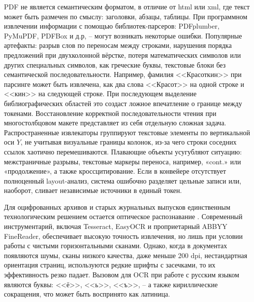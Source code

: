 PDF не является семантическим форматом, в отличие от html или xml, где текст может быть размечен по смыслу: заголовки, абзацы, таблицы. При программном извлечении информации с помощью библиотек-парсеров: PDFplumber, PyMuPDF, PDFBox и д.р\cite{hong2021challenges}, -- могут возникать некоторые ошибки. Популярные артефакты: разрыв слов по переносам между строками, нарушения порядка предложений при двухколонной вёрстке, потеря математических символов или других специальных символов, как греческие буквы, текстовые блоки без семантической последовательности. Например, фамилия <<Красоткин>> при парсинге может быть извлечена, как два слова <<Красот>> на одной строке и <<кин>> на следующей строке. При последующем выделение библиографических областей это создаст ложное впечатление о границе между токенами. Восстановление корректной последовательности чтения при многостолбцовом макете представляет из себя отдельную сложная задача. Распространенные извлекаторы группируют текстовые элементы по вертикальной оси \(Y\), не учитывая визуальные границы колонок, из-за чего строки соседних ссылок хаотично перемешиваются. Плавающие объекты усугубляют ситуацию: межстраничные разрывы, текстовые маркеры переноса, например, «cont.» или «продолжение», а также кроссцитирование. Если в конвейере отсутствует полноценный layout-анализ, система ошибочно разделяет цельные записи или, наоборот, сливает независимые источники в единый токен.

Для оцифрованных архивов и старых журнальных выпусков единственным технологическим решением остается оптическое распознавание \cite{sumathi2012techniques}. Современный инструментарий, включая Tesseract, EasyOCR и проприетарный ABBYY FineReader, обеспечивает высокую точность извлечения, но лишь при условии работы с чистыми горизонтальными сканами. Однако, когда в документах появляются шумы, сканы низкого качества, даже меньше 200 dpi, нестандартная ориентация страниц, используются редкие шрифты с засечками, то их эффективность резко падает. Вызовом для OCR при работе с русским языком являются буквы: <<ё>>, <<ь>>, <<ъ>>, -- а также кириллические сокращения, что может быть воспринято как латиница.   

